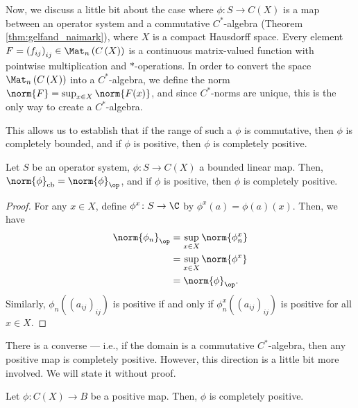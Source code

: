 Now, we discuss a little bit about the case where $\phi\colon S\rightarrow C\left( X \right)$ is a map between an operator system and a commutative $C^{\ast}$-algebra (Theorem \ref{thm:gelfand_naimark}), where $X$ is a compact Hausdorff space. Every element $F = \left( f_{ij} \right)_{ij}\in \Mat_n\left( C\left( X \right) \right)$ is a continuous matrix-valued function with pointwise multiplication and $\ast$-operations. In order to convert the space $\Mat_n\left( C\left( X \right) \right)$ into a $C^{\ast}$-algebra, we define the norm $\norm{F} = \sup_{x\in X}\norm{F(x)}$, and since $C^{\ast}$-norms are unique, this is the only way to create a $C^{\ast}$-algebra.\newline

This allows us to establish that if the range of such a $\phi$ is commutative, then $\phi$ is completely bounded, and if $\phi$ is positive, then $\phi$ is completely positive.
\begin{theorem}\label{thm:commutative_range_completely_positive}
  Let $S$ be an operator system, $\phi\colon S\rightarrow C(X)$ a bounded linear map. Then, $\norm{\phi}_{\cb} = \norm{\phi}_{\op}$, and if $\phi$ is positive, then $\phi$ is completely positive.
\end{theorem}
\begin{proof}
  For any $x\in X$, define $\phi^{x}\colon S\rightarrow \C$ by $\phi^x(a) = \phi(a)(x)$. Then, we have
  \begin{align*}
    \norm{\phi_n}_{\op} &= \sup_{x\in X}\norm{\phi_n^{x}}\\
                        &= \sup_{x\in X}\norm{\phi^{x}}\\
                        &= \norm{\phi}_{\op}.
  \end{align*}
  Similarly, $\phi_n\left( \left( a_{ij} \right)_{ij} \right)$ is positive if and only if $\phi_n^{x}\left( \left( a_{ij} \right)_{ij} \right)$ is positive for all $x\in X$.
\end{proof}
  There is a converse --- i.e., if the domain is a commutative $C^{\ast}$-algebra, then any positive map is completely positive. However, this direction is a little bit more involved. We will state it without proof.
\begin{theorem}\label{thm:commutative_domain_completely_positive}
  Let $\phi\colon C\left( X \right)\rightarrow B$ be a positive map. Then, $\phi$ is completely positive.
\end{theorem}
